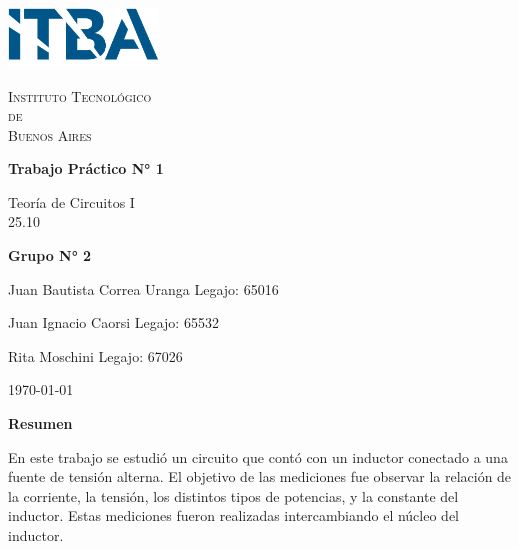 \documentclass{article}
\newcommand{\Facultad}{Instituto Tecnológico \\de\\ Buenos Aires} %
\newcommand{\TPn}{Trabajo Práctico N° 1}
\begin{document}
    \begin{titlepage} %

        \begin{flushleft}
            \centering
            \includegraphics[width=0.3\textwidth]{Logo_ITBA.png}
        \end{flushleft}

        \centering
            
        {\scshape\LARGE \Facultad \par} %
        \vspace{1cm}                    %


        {\huge\bfseries \TPn \par}
        \vspace{1.5cm}
        {\Large Teoría de Circuitos I\\ 25.10 \par}
        \vfill                      %
        {\Large \bfseries Grupo N° 2 \par}
        \vspace{1cm}
        {\large Juan Bautista Correa Uranga \hfill Legajo: 65016 \par} %
        {\large Juan Ignacio Caorsi \hfill Legajo: 65532  \par}
        {\large Rita Moschini \hfill Legajo: 67026 \par} 
        \vfill
        {\large \today\par}
        \vfil

    \end{titlepage}


    {\centering \LARGE \bfseries Resumen \par}
    
    En este trabajo se estudió un circuito que contó con un inductor conectado a una fuente de tensión alterna. El objetivo de las mediciones fue observar la relación de la corriente, la tensión, los distintos tipos de potencias, y la constante del inductor. Estas mediciones fueron realizadas intercambiando el núcleo del inductor. \par
\end{document}
